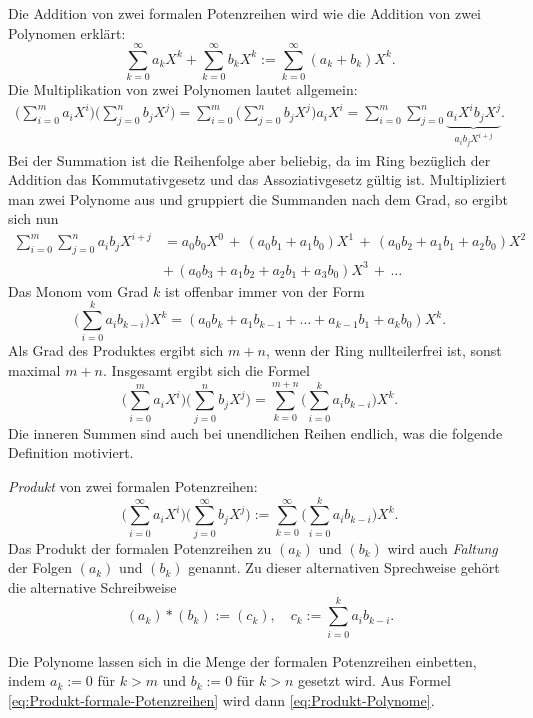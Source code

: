 \documentclass[a4paper,11pt,fleqn,twoside]{scrartcl}
\numberwithin{equation}{section}
\newcommand{\strong}[1]{{\sf\bfseries #1}}
\newenvironment{Definition}{\par\noindent\strong{Definition.}}{\par}
\newcommand{\emdef}[1]{\emph{#1}}
\begin{document}
Die Addition von zwei formalen Potenzreihen wird
wie die Addition von zwei Polynomen erklärt:
\begin{equation}\label{eq:Addition-formale-Potenzreihen}
\sum_{k=0}^\infty a_k X^k + \sum_{k=0}^\infty b_k X^k
:= \sum_{k=0}^\infty (a_k+b_k)X^k.
\end{equation}
Die Multiplikation von zwei Polynomen lautet allgemein:
\begin{align}
\bigg(\sum_{i=0}^m a_i X^i\bigg)\bigg(\sum_{j=0}^n b_j X^j\bigg)
= \sum_{i=0}^m \bigg(\sum_{j=0}^n b_j X^j\bigg) a_i X^i
= \sum_{i=0}^m \sum_{j=0}^n \underbrace{a_i X^i b_j X^j}_{\displaystyle a_ib_j X^{i+j}}.
\end{align}
Bei der Summation ist die Reihenfolge aber beliebig, da im Ring
bezüglich der Addition das Kommutativgesetz und das Assoziativgesetz
gültig ist. Multipliziert man zwei Polynome aus und gruppiert
die Summanden nach dem Grad, so ergibt sich nun
\begin{equation}
\begin{split}
\sum_{i=0}^m \sum_{j=0}^n a_ib_j X^{i+j}
&= a_0 b_0 X^0 \,+\, (a_0 b_1 + a_1 b_0) X^1\,+\,
(a_0 b_2 + a_1 b_1 + a_2 b_0) X^2\\
&+\,(a_0 b_3 + a_1 b_2 + a_2 b_1 + a_3 b_0) X^3\,+\,\ldots
\end{split}
\end{equation}
Das Monom vom Grad $k$ ist offenbar immer von der Form
\begin{equation}
\bigg(\sum_{i=0}^k a_i b_{k-i}\bigg) X^k
= (a_0 b_k + a_1 b_{k-1} + \ldots + a_{k-1} b_1 + a_k b_0) X^k.
\end{equation}
Als Grad des Produktes ergibt sich $m+n$, wenn der Ring
nullteilerfrei ist, sonst maximal $m+n$. Insgesamt ergibt sich
die Formel
\begin{equation}\label{eq:Produkt-Polynome}
\bigg(\sum_{i=0}^m a_i X^i\bigg)\bigg(\sum_{j=0}^n b_j X^j\bigg)
= \sum_{k=0}^{m+n}\bigg(\sum_{i=0}^k a_i b_{k-i}\bigg) X^k.
\end{equation}
Die inneren Summen sind auch bei unendlichen Reihen endlich, was
die folgende Definition motiviert.

\begin{Definition}
\emdef{Produkt} von zwei formalen Potenzreihen:
\begin{equation}\label{eq:Produkt-formale-Potenzreihen}
\bigg(\sum_{i=0}^\infty a_i X^i\bigg)\bigg(\sum_{j=0}^\infty b_j X^j\bigg)
:= \sum_{k=0}^\infty\bigg(\sum_{i=0}^k a_i b_{k-i}\bigg) X^k.
\end{equation}
Das Produkt der formalen Potenzreihen zu $(a_k)$ und $(b_k)$ wird
auch \emdef{Faltung} der Folgen $(a_k)$ und $(b_k)$ genannt.
Zu dieser alternativen Sprechweise gehört die alternative
Schreibweise%
\begin{equation}
(a_k)\ast (b_k) := (c_k),\quad c_k:=\sum_{i=0}^k a_i b_{k-i}.
\end{equation}
\end{Definition}
\noindent
Die Polynome lassen sich in die Menge der formalen Potenzreihen
einbetten, indem $a_k:=0$ für $k>m$ und $b_k:=0$ für $k>n$
gesetzt wird. Aus Formel \eqref{eq:Produkt-formale-Potenzreihen}
wird dann \eqref{eq:Produkt-Polynome}.
\end{document}
